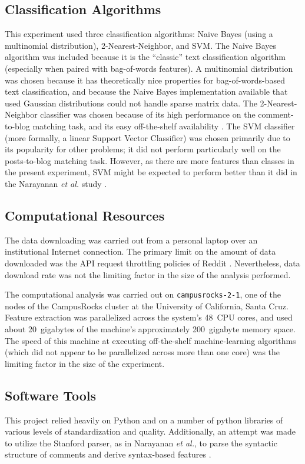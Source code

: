 \documentclass{article}
\begin{document}
\subsection{Classification Algorithms}
This experiment used three classification algorithms: Naive Bayes (using a multinomial distribution), 2-Nearest-Neighbor, and SVM. The Naive Bayes algorithm was included because it is the ``classic'' text classification algorithm (especially when paired with bag-of-words features). A multinomial distribution was chosen because it has theoretically nice properties for bag-of-words-based text classification, and because the Naive Bayes implementation available that used Gaussian distributions could not handle sparse matrix data. The 2-Nearest-Neighbor classifier was chosen because of its high performance on the comment-to-blog matching task, and its easy off-the-shelf availability \cite{narayanan2012feasibility, pedregosa2011scikit}. The SVM classifier (more formally, a linear Support Vector Classifier) was chosen primarily due to its popularity for other problems; it did not perform particularly well on the posts-to-blog matching task. However, as there are more features than classes in the present experiment, SVM might be expected to perform better than it did in the Narayanan \textit{et al.} study \cite{narayanan2012feasibility}.

\subsection{Computational Resources}
The data downloading was carried out from a personal laptop over an institutional Internet connection. The primary limit on the amount of data downloaded was the API request throttling policies of Reddit \cite{boe2012python}. Nevertheless, data download rate was not the limiting factor in the size of the analysis performed.

The computational analysis was carried out on \texttt{campusrocks-2-1}, one of the nodes of the CampusRocks cluster at the University of California, Santa Cruz. Feature extraction was parallelized across the system's 48~CPU cores, and used about 20~gigabytes of the machine's approximately 200~gigabyte memory space. The speed of this machine at executing off-the-shelf machine-learning algorithms (which did not appear to be parallelized across more than one core) was the limiting factor in the size of the experiment.

\subsection{Software Tools}
This project relied heavily on Python and on a number of python libraries of various levels of standardization and quality. Additionally, an attempt was made to utilize the Stanford parser, as in Narayanan \textit{et al.}, to parse the syntactic structure of comments and derive syntax-based features \cite{klein2003accurate, narayanan2012feasibility}.
\end{document}
